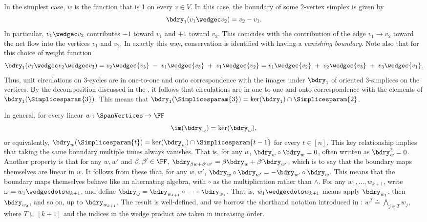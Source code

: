 In the simplest case, \(w\) is the function that is 1 on every $v \in V$.
In this case, the boundary of some 2-vertex simplex is given by
\[
  \bdry_1( v_1 \wedgec v_2 ) = v_2 - v_1.
\]
In particular, \(v_1 \wedgec v_2\) contributes \(-1\) toward \(v_1\)
and \(+1\) toward \(v_2\).
This coincides with the contribution of the edge \(v_1\to v_2\) toward the
net flow into the vertices \(v_1\) and \(v_2\).
In exactly this way, conservation is identified with having a
\emph{vanishing boundary}. Note also that for this choice of weight function
\[ \bdry_1(v_1 \wedgec v_2 \wedgec v_3)
= {v_2}\wedgec {v_3} \;-\; {v_1}\wedgec {v_3} \;+\; {v_1}\wedgec {v_2} = {v_1}\wedgec {v_2} \;+\; {v_2}\wedgec {v_3} \;+\; {v_3}\wedgec {v_1}.\]
Thus, unit circulations on 3-cycles are in one-to-one and onto correspondence with the images under $\bdry_1$ of oriented 3-simplices on the vertices. By the decomposition discussed in the  
, it follows that circulations are in one-to-one and onto correspondence with the elements of $\bdry_1(\Simplicesparam{3})$. This means that $\bdry_1(\Simplicesparam{3}) = \ker(\bdry_1) \cap \Simplicesparam{2}$.

In general, for every linear $w: \SpanVertices \to \FF$
\begin{equation}\label{eq.key}
\im(\bdry_w) = \ker(\bdry_w),
\end{equation}
or equivalently, 
$\bdry_w(\Simplicesparam{t}) = \ker(\bdry_w) \cap \Simplicesparam{t-1}$ for every $t \in [n]$.
This key relationship implies that taking the same boundary multiple times always vanishes.
That is, for any \(w\), \(\bdry_w \circ \bdry_w = 0\), often written as $\bdry_w^2 = 0$.
Another property is that for any \(w, w'\) and \(\beta,\beta'\in\FF\),
\(\bdry_{\beta w + \beta'w'} = \beta\bdry_w + \beta'\bdry_{w'}\),
which is to say that the boundary maps themselves are linear in \(w\).
It follows from these that, for any \(w,w'\), \(\bdry_w \circ \bdry_{w'} =
-\bdry_{w'}\circ \bdry_w\).
This means that the boundary maps themselves behave like an
alternating algebra, with \(\circ\) as the multiplication rather than
\(\wedge\).
For any \(w_1,\ldots,w_{k+1}\), write \(\omega = w_1\wedgecdots w_{k+1}\),
and define
\(\bdry_\omega = \bdry_{w_{k+1}} \circ \cdots \circ \bdry_{w_1}\).
That is, \(w_1\wedgecdots w_{k+1}\) means apply \(\bdry_{w_1}\),
then \(\bdry_{w_2}\), and so on, up to \(\bdry_{w_{k+1}}\).
The result is well-defined, and we borrow the shorthand notation introduced in : $w^T \doteq \bigwedge_{j\in T} w_j$, where $T \subseteq [k+1]$ and the indices in the wedge product are taken in increasing order.

